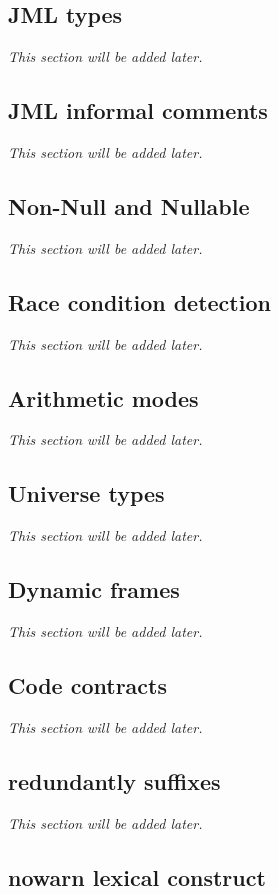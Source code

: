 \documentclass{report}%
\begin{document}
\subsection{JML types}
\textit{This section will be added later.} %

\subsection{JML informal comments}
\textit{This section will be added later.} %

\subsection{Non-Null and Nullable}
\textit{This section will be added later.} %

\subsection{Race condition detection}
\textit{This section will be added later.} %

\subsection{Arithmetic modes}
\textit{This section will be added later.} %

\subsection{Universe types}
\textit{This section will be added later.} %

\subsection{Dynamic frames}
\textit{This section will be added later.} %

\subsection{Code contracts}
\textit{This section will be added later.} %

\subsection{redundantly suffixes}
\textit{This section will be added later.} %

\subsection{nowarn lexical construct}
\end{document}
